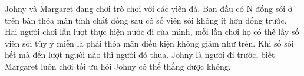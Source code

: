 Johny và Margaret đang chơi trò chơi với các viên đá. Ban đầu có N đống sỏi ở trên bàn thỏa mãn tính chất đống sau có số viên sỏi không ít hơn đống trước. Hai người chơi lần lượt thực hiện nước đi của mình, mỗi lần chơi họ có thể lấy số viên sỏi tùy ý miễn là phải thỏa mãn điều kiện không giảm như trên. Khi số sỏi hết mà đến lượt người nào thì người đó thua. Johny là người đi trước, biết Margaret luôn chơi tối ưu hỏi Johny có thể thắng được không.